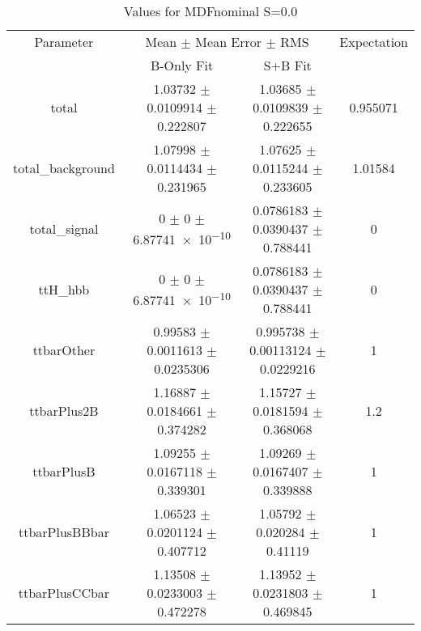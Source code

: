 \begin{table}
\centering
\caption{Values for MDFnominal S=0.0}
\begin{tabular}{cccc}
\toprule
Parameter & \multicolumn{2}{c}{Mean $\pm$ Mean Error $\pm$ RMS} & Expectation\\
 & B-Only Fit & S+B Fit & \\
\midrule
total & \num{1.03732} $\pm$ \num{0.0109914} $\pm$ \num{0.222807} & \num{1.03685} $\pm$ \num{0.0109839} $\pm$ \num{0.222655} & \num{0.955071}\\
total\_background & \num{1.07998} $\pm$ \num{0.0114434} $\pm$ \num{0.231965} & \num{1.07625} $\pm$ \num{0.0115244} $\pm$ \num{0.233605} & \num{1.01584}\\
total\_signal & \num{0} $\pm$ \num{0} $\pm$ \num{6.87741e-10} & \num{0.0786183} $\pm$ \num{0.0390437} $\pm$ \num{0.788441} & \num{0}\\
ttH\_hbb & \num{0} $\pm$ \num{0} $\pm$ \num{6.87741e-10} & \num{0.0786183} $\pm$ \num{0.0390437} $\pm$ \num{0.788441} & \num{0}\\
ttbarOther & \num{0.99583} $\pm$ \num{0.0011613} $\pm$ \num{0.0235306} & \num{0.995738} $\pm$ \num{0.00113124} $\pm$ \num{0.0229216} & \num{1}\\
ttbarPlus2B & \num{1.16887} $\pm$ \num{0.0184661} $\pm$ \num{0.374282} & \num{1.15727} $\pm$ \num{0.0181594} $\pm$ \num{0.368068} & \num{1.2}\\
ttbarPlusB & \num{1.09255} $\pm$ \num{0.0167118} $\pm$ \num{0.339301} & \num{1.09269} $\pm$ \num{0.0167407} $\pm$ \num{0.339888} & \num{1}\\
ttbarPlusBBbar & \num{1.06523} $\pm$ \num{0.0201124} $\pm$ \num{0.407712} & \num{1.05792} $\pm$ \num{0.020284} $\pm$ \num{0.41119} & \num{1}\\
ttbarPlusCCbar & \num{1.13508} $\pm$ \num{0.0233003} $\pm$ \num{0.472278} & \num{1.13952} $\pm$ \num{0.0231803} $\pm$ \num{0.469845} & \num{1}\\
\bottomrule
\end{tabular}
\end{table}